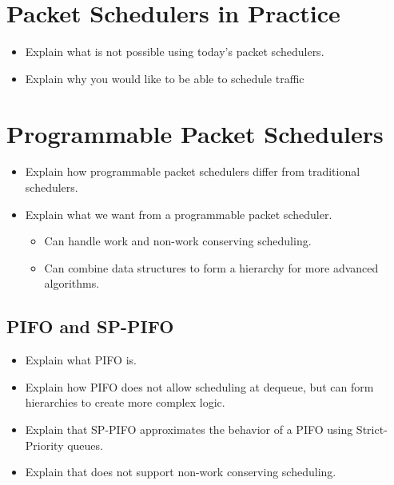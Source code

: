 \documentclass[sigconf, nonacm]{acmart}
\begin{document}
\section{Packet Schedulers in Practice}


\begin{itemize}
  \item Explain what is not possible using today's packet schedulers.
  \item Explain why you would like to be able to schedule traffic
\end{itemize}


\section{Programmable Packet Schedulers}


\begin{itemize}
  \item Explain how programmable packet schedulers differ from traditional schedulers.
  \item Explain what we want from a programmable packet scheduler.
        \begin{itemize}
          \item Can handle work and non-work conserving scheduling.
          \item Can combine data structures to form a hierarchy for more advanced algorithms.
        \end{itemize}
\end{itemize}



\subsection{PIFO and SP-PIFO}

\begin{itemize}
  \item Explain what PIFO\cite{Sivaraman2016} is.
  \item Explain how PIFO does not allow scheduling at dequeue, but can form hierarchies to create more complex logic.
  \item Explain that SP-PIFO\cite{Alcoz2020} approximates the behavior of a PIFO using Strict-Priority queues.
  \item Explain that does not support non-work conserving scheduling.
\end{itemize}
\end{document}
